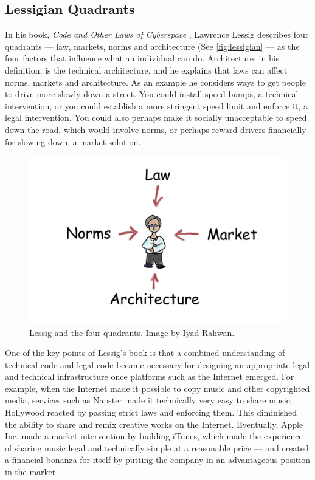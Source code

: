 \subsection{Lessigian Quadrants}
\label{sec:lessigq}

In his book, \emph{Code and Other Laws of Cyberspace} \cite{lessig2009code}, Lawrence Lessig describes four quadrants --- law, markets, norms and architecture (See \autoref{fig:lessigian} --- as the four factors that influence what an individual can do. Architecture, in his definition, is the technical architecture, and he explains that laws can affect norms, markets and architecture. As an example he considers ways to get people to drive more slowly down a street. You could install speed bumps, a technical intervention, or you could establish a more stringent speed limit and enforce it, a legal intervention. You could also perhaps make it socially unacceptable to speed down the road, which would involve norms, or perhaps reward drivers financially for slowing down, a market solution. 

\begin{figure}[h]
 \centering
 \includegraphics[width=.5\textwidth]{pictures/lessig.jpg}
 \caption{Lessig and the four quadrants. Image by Iyad Rahwan.}
 \label{fig:lessigian}
\end{figure}

One of the key points of Lessig's book is that a combined understanding of technical code and legal code became necessary for designing an appropriate legal and technical infrastructure once platforms such as the Internet emerged. For example, when the Internet made it possible to copy music and other copyrighted media, services such as Napster made it technically very easy to share music. Hollywood reacted by passing strict laws and enforcing them. This diminished the ability to share and remix creative works on the Internet. Eventually, Apple Inc. made a market intervention by building iTunes, which made the experience of sharing music legal and technically simple at a reasonable price --- and created a financial bonanza for itself by putting the company in an advantageous position in the market.

